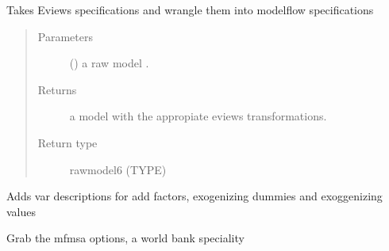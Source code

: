 \documentclass[letterpaper,10pt,english]{sphinxmanual}
\begin{document}
\begin{fulllineitems}
\begin{fulllineitems}
\end{fulllineitems}


\begin{fulllineitems}
\label{\detokenize{index:modelgrabwf2.GrabWfModel.trans_eviews}}
\pysigstartsignatures
{}
\pysigstopsignatures
\sphinxAtStartPar
Takes Eviews specifications and wrangle them into modelflow specifications
\begin{quote}\begin{description}
\item[{Parameters}] \leavevmode
\sphinxAtStartPar
{} () \textendash{} a raw model .

\item[{Returns}] \leavevmode
\sphinxAtStartPar
a model with the appropiate eviews transformations.

\item[{Return type}] \leavevmode
\sphinxAtStartPar
rawmodel6 (TYPE)

\end{description}\end{quote}

\end{fulllineitems}


\begin{fulllineitems}
\label{\detokenize{index:modelgrabwf2.GrabWfModel.var_description}}
\pysigstartsignatures
{}
\pysigstopsignatures
\sphinxAtStartPar
Adds var descriptions for add factors, exogenizing dummies and exoggenizing values

\end{fulllineitems}


\begin{fulllineitems}
\label{\detokenize{index:modelgrabwf2.GrabWfModel.mfmsa_options}}
\pysigstartsignatures
{}
\pysigstopsignatures
\sphinxAtStartPar
Grab the mfmsa options, a world bank speciality


\end{fulllineitems}
\end{fulllineitems}
\end{document}
